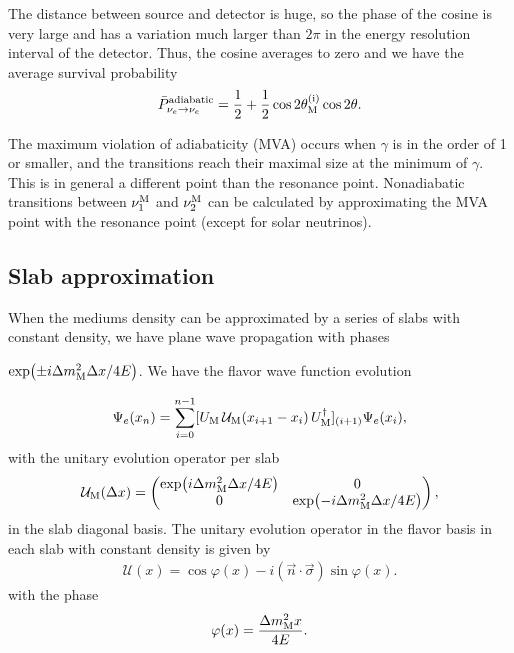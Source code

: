 \documentclass[twocolumn]{article}
\begin{document}
 The distance between source and detector is huge, so the phase of the cosine is very large and has a variation much larger than $2\pi$ in the energy resolution interval of the detector. Thus, the cosine averages to zero and we have the average survival probability 
\begin{align*}
  \bar{P}^{\text{{adiabatic}}}_{\nu_e \to \nu_e} = \frac{1}{2} + \frac{1}{2}\cos{2 \theta^{\ensuremath{\text{{(i)}}}}_{\ensuremath{\text{{M}}}}}\cos{2\theta}
.\end{align*}

The maximum violation of adiabaticity (MVA) occurs when $\gamma$ is in the order of 1 or smaller, and the transitions reach their maximal size at the minimum of $\gamma$. This is in general a different point than the resonance point. Nonadiabatic transitions between $\nu_{1}^{\text{{M}}}$ and $\nu_{2}^{\text{{M}}}$ can be calculated by approximating the MVA point with the resonance point (except for solar neutrinos). 

\subsection*{Slab approximation}
When the mediums density can be approximated by a series of slabs with constant density, we have plane wave propagation with phases 

$\exp(\pm i \dm_\t{M} \Delta x / 4E)$. 
We have the flavor wave function evolution

\begin{align*}
  \Psi_e(x_n) = \sum_{i=0}^{n-1}[U_{\text{{M}}}\,\mathcal{U}_{\text{{M}}}(x_{i+1} - x_{i})\,U^\dagger_{\text{{M}}}]_{(i+1)}\Psi_e(x_i)
,\end{align*}
with the unitary evolution operator per slab
\begin{align*}
  \mathcal{U}_\t{M}(\Delta x) = \begin{pmatrix} 
    \exp(i\dm_\t{M} \Delta x / 4E) & 0 \\
                                  0 & \exp(-i\dm_\t{M} \Delta x / 4E) 
                                \end{pmatrix}
,\end{align*} 
in the slab diagonal basis. 
The unitary evolution operator in the flavor basis in each slab with constant density is given by
\begin{align*}
  \mathcal{U}(x) = \cos{\varphi (x)} - i(\vec{n} \cdot \vec{\sigma})\sin{\varphi (x)}
.\end{align*}
with the phase
\begin{align*}
  \varphi (x) = \frac{\dm_\t{M} x}{4E}
.\end{align*}
\end{document}
